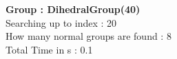 \textbf{Group : DihedralGroup(40)}\\
Searching up to index : 20\\
How many normal groups are found : 8\\
Total Time in s : 0.1\\
